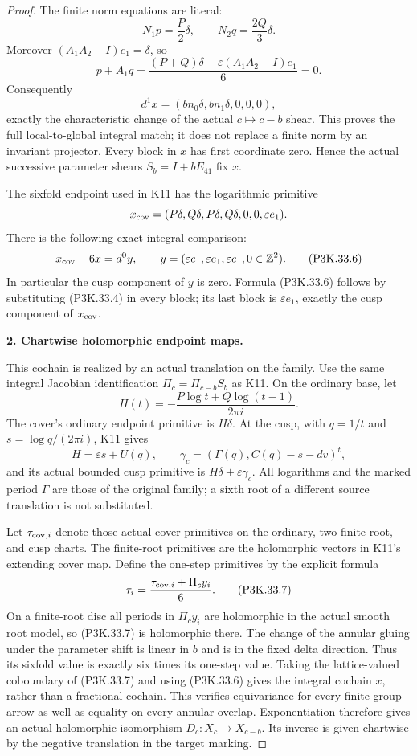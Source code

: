\begin{proof}
The finite norm equations are literal:
\[
 N_1p=\frac P2\delta,\qquad
 N_2q=\frac{2Q}3\delta.
\]
Moreover
\((A_1A_2-I)e_1=\delta\), so
\[
 p+A_1q=\frac{(P+Q)\delta-\varepsilon(A_1A_2-I)e_1}{6}=0.
\]
Consequently
\[
 d^1x=(bn_0\delta,bn_1\delta,0,0,0),                 \tag{P3K.33.5}
\]
exactly the characteristic change of the actual \(c\mapsto c-b\)
shear. This proves the full local-to-global integral match; it
does not replace a finite norm by an invariant projector.
Every block in \(x\) has first coordinate zero. Hence the actual
successive parameter shears \(S_b=I+bE_{41}\) fix \(x\).

The sixfold endpoint used in K11 has the logarithmic primitive
\[
 x_{\rm cov}=(P\delta,Q\delta,P\delta,Q\delta,0,0,\varepsilon e_1).
\]
There is the following exact integral comparison:
\[
 x_{\rm cov}-6x=d^0y,\qquad
 y=(\varepsilon e_1,\varepsilon e_1,\varepsilon e_1,
       0\in\mathbb Z^2).                             \tag{P3K.33.6}
\]
In particular the cusp component of \(y\) is zero. Formula
(P3K.33.6) follows by substituting (P3K.33.4) in every block; its last
block is \(\varepsilon e_1\), exactly the cusp component of
\(x_{\rm cov}\).

\par\medskip\noindent\textbf{2. Chartwise holomorphic endpoint maps.}\enspace

This cochain is realized by an actual translation on the family.
Use the same integral Jacobian identification
\(\Pi_c=\Pi_{c-b}S_b\) as K11. On the ordinary base, let
\[
 H(t)=-\frac{P\log t+Q\log(t-1)}{2\pi i}.
\]
The cover's ordinary endpoint primitive is \(H\delta\).
At the cusp, with \(q=1/t\) and
\(s=\log q/(2\pi i)\), K11 gives
\[
 H=\varepsilon s+U(q),\qquad
 \gamma_c=(\Gamma(q),C(q)-s-dv)^t,
\]
and its actual bounded cusp primitive is
\(H\delta+\varepsilon\gamma_c\).
All logarithms and the marked period \(\Gamma\) are those of
the original family; a sixth root of a different source
translation is not substituted.

Let \(\tau_{{\rm cov},i}\) denote those actual cover primitives
on the ordinary, two finite-root, and cusp charts. The finite-root
primitives are the holomorphic vectors in K11's extending cover
map. Define the one-step primitives by the explicit formula
\[
       \tau_i=\frac{\tau_{{\rm cov},i}+\Pi_cy_i}{6}.
                                                               \tag{P3K.33.7}
\]
On a finite-root disc all periods in \(\Pi_c y_i\) are
holomorphic in the actual smooth root model, so (P3K.33.7) is
holomorphic there. The change of the annular gluing under the
parameter shift is linear in \(b\) and is in the fixed delta
direction. Thus its sixfold value is exactly six times its
one-step value. Taking the lattice-valued coboundary of (P3K.33.7)
and using (P3K.33.6) gives the integral cochain \(x\), rather
than a fractional cochain. This verifies equivariance for every
finite group arrow as well as equality on every annular overlap.
Exponentiation therefore gives an actual holomorphic isomorphism
\(D_c:X_c\longrightarrow X_{c-b}\). Its inverse is given
chartwise by the negative translation in the target marking.


\end{proof}
